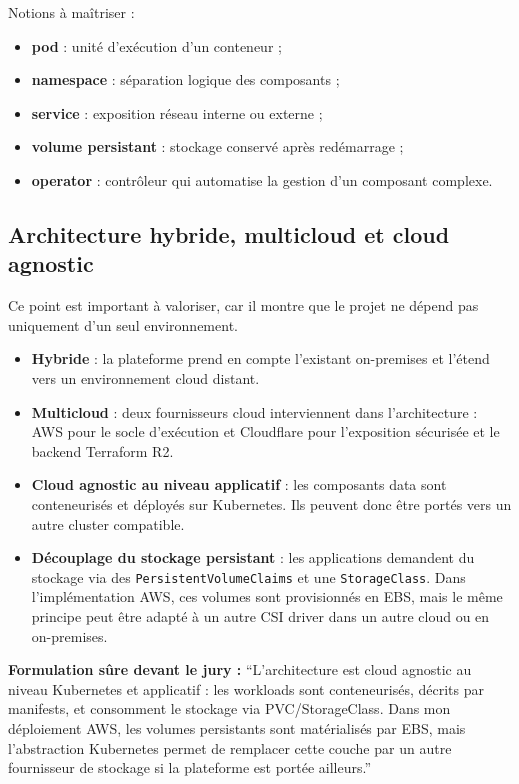 \documentclass[11pt,a4paper]{article}
\newcommand{\important}[1]{%
  \vspace{0.25cm}
  \noindent
  \colorbox{softblue}{%
    \parbox{\dimexpr\textwidth-2\fboxsep\relax}{#1}%
  }
  \vspace{0.2cm}
}
\begin{document}
Notions à maîtriser :
\begin{itemize}
  \item \textbf{pod} : unité d'exécution d'un conteneur ;
  \item \textbf{namespace} : séparation logique des composants ;
  \item \textbf{service} : exposition réseau interne ou externe ;
  \item \textbf{volume persistant} : stockage conservé après redémarrage ;
  \item \textbf{operator} : contrôleur qui automatise la gestion d'un composant complexe.
\end{itemize}

\subsection{Architecture hybride, multicloud et cloud agnostic}

Ce point est important à valoriser, car il montre que le projet ne dépend pas uniquement d'un seul environnement.

\begin{itemize}
  \item \textbf{Hybride} : la plateforme prend en compte l'existant on-premises et l'étend vers un environnement cloud distant.
  \item \textbf{Multicloud} : deux fournisseurs cloud interviennent dans l'architecture : AWS pour le socle d'exécution et Cloudflare pour l'exposition sécurisée et le backend Terraform R2.
  \item \textbf{Cloud agnostic au niveau applicatif} : les composants data sont conteneurisés et déployés sur Kubernetes. Ils peuvent donc être portés vers un autre cluster compatible.
  \item \textbf{Découplage du stockage persistant} : les applications demandent du stockage via des \texttt{PersistentVolumeClaims} et une \texttt{StorageClass}. Dans l'implémentation AWS, ces volumes sont provisionnés en EBS, mais le même principe peut être adapté à un autre CSI driver dans un autre cloud ou en on-premises.
\end{itemize}

\important{
\textbf{Formulation sûre devant le jury :}
``L'architecture est cloud agnostic au niveau Kubernetes et applicatif : les workloads sont conteneurisés, décrits par manifests, et consomment le stockage via PVC/StorageClass. Dans mon déploiement AWS, les volumes persistants sont matérialisés par EBS, mais l'abstraction Kubernetes permet de remplacer cette couche par un autre fournisseur de stockage si la plateforme est portée ailleurs.''
}
\end{document}
